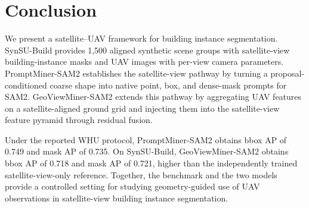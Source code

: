 \documentclass[letterpaper,journal]{IEEEtran}
\begin{document}
\section{Conclusion}
\label{sec:conclusion}
We present a satellite--UAV framework for building instance segmentation. SynSU-Build provides
1,500 aligned synthetic scene groups with satellite-view building-instance masks and UAV images
with per-view camera parameters. PromptMiner-SAM2 establishes the satellite-view pathway by
turning a proposal-conditioned coarse shape into native point, box, and dense-mask prompts for
SAM2. GeoViewMiner-SAM2 extends this pathway by aggregating UAV features on a satellite-aligned
ground grid and injecting them into the satellite-view feature pyramid through residual fusion.

Under the reported WHU protocol, PromptMiner-SAM2 obtains bbox AP of 0.749 and mask AP of
0.735. On SynSU-Build, GeoViewMiner-SAM2 obtains bbox AP of 0.718 and mask AP of 0.721, higher
than the independently trained satellite-view-only reference. Together, the benchmark and the
two models provide a controlled setting for studying geometry-guided use of UAV observations in
satellite-view building instance segmentation.
\end{document}
